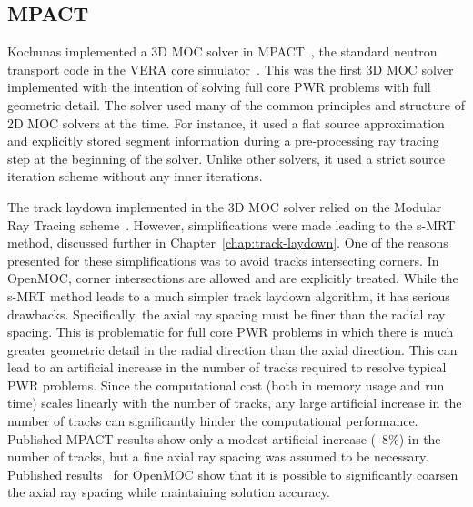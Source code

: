 \subsection{MPACT}
\label{sec:mpact}

Kochunas implemented a 3D \ac{MOC} solver in MPACT~\cite{mpact_initial, kochunas}, the standard neutron transport code in the VERA core simulator~\cite{vera}.  This was the first 3D \ac{MOC} solver implemented with the intention of solving full core PWR problems with full geometric detail. The solver used many of the common principles and structure of 2D \ac{MOC} solvers at the time. For instance, it used a flat source approximation and explicitly stored segment information during a pre-processing ray tracing step at the beginning of the solver. Unlike other solvers, it used a strict source iteration scheme without any inner iterations. 

The track laydown implemented in the 3D \ac{MOC} solver relied on the Modular Ray Tracing scheme~\cite{liu_mrt}. However, simplifications were made leading to the s-MRT method, discussed further in Chapter~\ref{chap:track-laydown}. One of the reasons presented for these simplifications was to avoid tracks intersecting corners. In OpenMOC, corner intersections are allowed and are explicitly treated. While the s-MRT method leads to a much simpler track laydown algorithm, it has serious drawbacks. Specifically, the axial ray spacing must be finer than the radial ray spacing. This is problematic for full core \ac{PWR} problems in which there is much greater geometric detail in the radial direction than the axial direction. This can lead to an artificial increase in the number of tracks required to resolve typical \ac{PWR} problems. Since the computational cost (both in memory usage and run time) scales linearly with the number of tracks, any large artificial increase in the number of tracks can significantly hinder the computational performance. Published MPACT results show only a modest artificial increase (~8\%) in the number of tracks, but a fine axial ray spacing was assumed to be necessary. Published results~\cite{shaner-laydown, openmoc-beavrs} for OpenMOC show that it is possible to significantly coarsen the axial ray spacing while maintaining solution accuracy.

